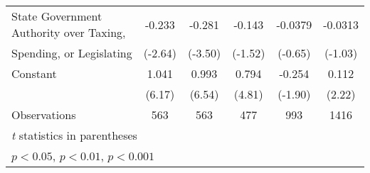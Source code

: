 {\begin{tabular}{l*{5}{c}}
\addlinespace
State Government Authority over Taxing, &-0.233\sym{**} &-0.281\sym{***}&-0.143         &-0.0379         &-0.0313         \\
Spending, or Legislating                &(-2.64)         &(-3.50)         &(-1.52)         &(-0.65)         &(-1.03)         \\
\addlinespace
Constant                                &1.041\sym{***}&0.993\sym{***}&0.794\sym{***}&-0.254         &0.112\sym{*}  \\
                                        &(6.17)         &(6.54)         &(4.81)         &(-1.90)         &(2.22)         \\
\midrule
Observations                            &  563         &  563         &  477         &  993         & 1416         \\
\bottomrule
\multicolumn{6}{l}{\footnotesize \textit{t} statistics in parentheses}\\
\multicolumn{6}{l}{\footnotesize \sym{*} \(p<0.05\), \sym{**} \(p<0.01\), \sym{***} \(p<0.001\)}\\
\end{tabular}
}
